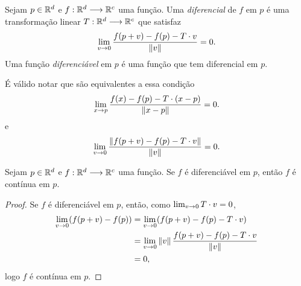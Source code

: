 \begin{defi}
Sejam $p \in \mathbb{R}^d$ e $f: \mathbb{R}^d \longrightarrow \mathbb{R}^c$ uma função. Uma \emph{diferencial} de $f$ em $p$ é uma transformação linear $T : \mathbb{R}^d \longrightarrow \mathbb{R}^c$ que satisfaz
	\begin{equation*}
	\lim_{v \rightarrow 0} \frac{f(p+v)-f(p)-T \cdot v}{\left\Vert{v}\right\Vert} = 0.
	\end{equation*}
Uma função \emph{diferenciável} em $p$ é uma função que tem diferencial em $p$.
\end{defi}

É válido notar que são equivalentes a essa condição
	\begin{equation*}
	\lim_{x \rightarrow p} \frac{f(x)-f(p)-T\cdot(x-p)}{\left\Vert{x-p}\right\Vert} = 0.
	\end{equation*}
e
	\begin{equation*}
	\lim_{v \rightarrow 0} \frac{\left\Vert{f(p+v)-f(p)-T \cdot v}\right\Vert}{\left\Vert{v}\right\Vert} = 0.
	\end{equation*}

\begin{prop}
Sejam $p \in \mathbb{R}^d$ e $f: \mathbb{R}^d \longrightarrow \mathbb{R}^c$ uma função. Se $f$ é diferenciável em $p$, então $f$ é contínua em $p$.
\end{prop}
\begin{proof}
Se $f$ é diferenciável em $p$, então, como $\lim_{v \rightarrow 0} T \cdot v = 0$,
	\begin{align*}
	\lim_{v \rightarrow 0} (f(p+v)-f(p)) &= \lim_{v \rightarrow 0}(f(p+v)-f(p)-T \cdot v) \\
		&= \lim_{v \rightarrow 0}\left\Vert{v}\right\Vert \frac{f(p+v)-f(p)-T \cdot v}{\left\Vert{v}\right\Vert} \\
		&= 0,
	\end{align*}
logo $f$ é contínua em $p$.
\end{proof}

